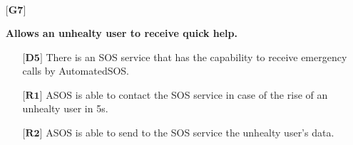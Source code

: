 \begin{itemize}
	\item[${\textbf{[G7]}}$] {\textbf{Allows an unhealty user to receive quick help.}
		\begin{itemize}
			\item[$\textbf{[D5]}$] {There is an SOS service that has the capability to receive emergency calls by AutomatedSOS.}
			\item[$\textbf{[R1]}$] {ASOS is able to contact the SOS service in case of the rise of an unhealty user in 5s.}
			\item[$\textbf{[R2]}$] {ASOS is able to send to the SOS service the unhealty user's data.}
		\end{itemize}}


\end{itemize}